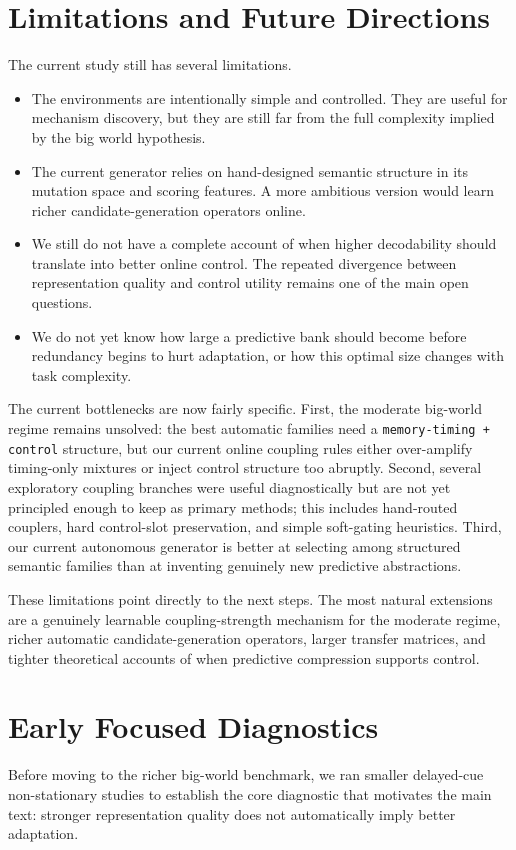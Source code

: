 \documentclass[11pt]{article}
\begin{document}
\section{Limitations and Future Directions}
The current study still has several limitations.
\begin{itemize}
    \item The environments are intentionally simple and controlled. They are useful for mechanism discovery, but they are still far from the full complexity implied by the big world hypothesis.
    \item The current generator relies on hand-designed semantic structure in its mutation space and scoring features. A more ambitious version would learn richer candidate-generation operators online.
    \item We still do not have a complete account of when higher decodability should translate into better online control. The repeated divergence between representation quality and control utility remains one of the main open questions.
    \item We do not yet know how large a predictive bank should become before redundancy begins to hurt adaptation, or how this optimal size changes with task complexity.
\end{itemize}

The current bottlenecks are now fairly specific. First, the moderate big-world regime remains unsolved: the best automatic families need a \texttt{memory-timing + control} structure, but our current online coupling rules either over-amplify timing-only mixtures or inject control structure too abruptly. Second, several exploratory coupling branches were useful diagnostically but are not yet principled enough to keep as primary methods; this includes hand-routed couplers, hard control-slot preservation, and simple soft-gating heuristics. Third, our current autonomous generator is better at selecting among structured semantic families than at inventing genuinely new predictive abstractions.

These limitations point directly to the next steps. The most natural extensions are a genuinely learnable coupling-strength mechanism for the moderate regime, richer automatic candidate-generation operators, larger transfer matrices, and tighter theoretical accounts of when predictive compression supports control.

\appendix

\section{Early Focused Diagnostics}
Before moving to the richer big-world benchmark, we ran smaller delayed-cue non-stationary studies to establish the core diagnostic that motivates the main text: stronger representation quality does not automatically imply better adaptation.
\end{document}
